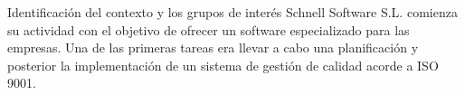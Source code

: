 \documentclass[10pt,a4paper]{article}
\begin{document}
\begin{enumerate}
Identificación del contexto y los grupos de interés
Schnell Software S.L. comienza su actividad con el objetivo de ofrecer un software especializado para las empresas. Una de las primeras tareas era llevar a cabo una planificación y posterior la implementación de un sistema de gestión de calidad acorde a ISO 9001.


\end{enumerate}
\end{document}
